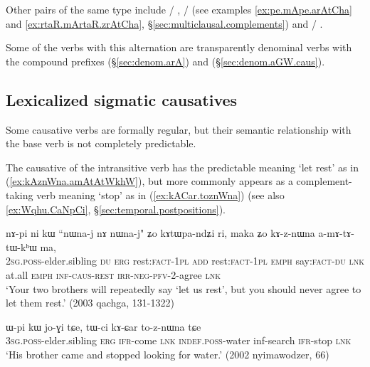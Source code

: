  Other pairs of the same type include   / ,   /  (see examples \ref{ex:pe.mApe.arAtCha} and \ref{ex:rtaR.mArtaR.zrAtCha}, §\ref{sec:multiclausal.complements}) and 	/ . 
 
 Some of the verbs with this  alternation are transparently denominal verbs with the compound prefixes  (§\ref{sec:denom.arA}) and  (§\ref{sec:denom.aGW.caus}).

 

\subsection{Lexicalized sigmatic causatives} \label{sec:sig.caus.lexicalized}
Some causative verbs are formally regular, but their semantic relationship with the base verb is not completely predictable.

The causative  of the intransitive verb  has the predictable meaning `let rest' as in (\ref{ex:kAznWna.amAtAtWkhW}), but more commonly appears as a complement-taking verb meaning `stop' as in (\ref{ex:kACar.toznWna}) (see also \ref{ex:Wqhu.CaNpCi}, §\ref{sec:temporal.postpositions}).

\begin{exe} 
\ex \label{ex:kAznWna.amAtAtWkhW}
\gll nɤ-pi ni kɯ ``nɯna-j nɤ nɯna-j" ʑo kɤtɯpa-ndʑi ri, maka ʑo kɤ-z-nɯna a-mɤ-tɤ-tɯ-kʰɯ ma,\\
\textsc{2sg}.\textsc{poss}-elder.sibling \textsc{du} \textsc{erg} rest:\textsc{fact}-\textsc{1pl} \textsc{add}  rest:\textsc{fact}-\textsc{1pl} \textsc{emph} say:\textsc{fact}-\textsc{du} \textsc{lnk} at.all \textsc{emph} \textsc{inf}-\textsc{caus}-\textsc{rest} \textsc{irr}-\textsc{neg}-\textsc{pfv}-2-agree \textsc{lnk} \\
\glt `Your two brothers will repeatedly say `let us rest', but you should never agree to let them rest.' (2003 qachga, 131-1322)
\end{exe}

\begin{exe} 
\ex \label{ex:kACar.toznWna}
\gll ɯ-pi kɯ jo-ɣi tɕe, tɯ-ci kɤ-ɕar to-z-nɯna tɕe \\
\textsc{3sg}.\textsc{poss}-elder.sibling \textsc{erg} \textsc{ifr}-come \textsc{lnk} \textsc{indef}.\textsc{poss}-water inf-search \textsc{ifr}-stop \textsc{lnk} \\
\glt `His brother came and stopped looking for water.' (2002 nyimawodzer, 66)
\end{exe}

